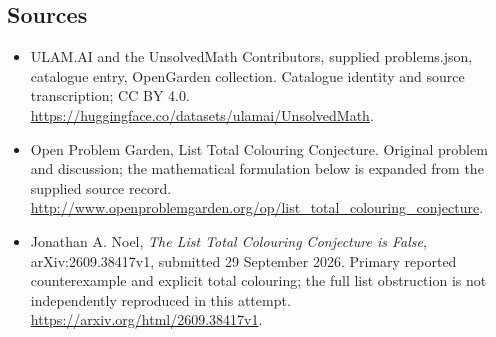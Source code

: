 \documentclass[11pt,a4paper]{article}
\begin{document}
\subsection{Sources}
\begin{itemize}
\item[S1] ULAM.AI and the UnsolvedMath Contributors, supplied problems.json, catalogue entry, OpenGarden collection. Catalogue identity and source transcription; CC BY 4.0.
\url{https://huggingface.co/datasets/ulamai/UnsolvedMath}.
\item[S2] Open Problem Garden, List Total Colouring Conjecture. Original problem and discussion; the mathematical formulation below is expanded from the supplied source record.
\url{http://www.openproblemgarden.org/op/list_total_colouring_conjecture}.
\item[S3] Jonathan A. Noel, \emph{The List Total Colouring Conjecture is False}, arXiv:2609.38417v1, submitted 29 September 2026. Primary reported counterexample and explicit total colouring; the full list obstruction is not independently reproduced in this attempt.
\url{https://arxiv.org/html/2609.38417v1}.
\end{itemize}
\end{document}

